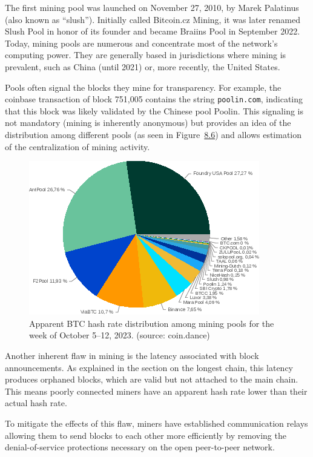 \documentclass[
  a5paper,
  smalldemyvopaper,10pt,twoside,onecolumn,openright,extrafontsizes,hidelinks]{memoir}
\begin{document}
The first mining pool was launched on November 27, 2010, by Marek
Palatinus (also known as ``slush''). Initially called Bitcoin.cz Mining,
it was later renamed Slush Pool in honor of its founder and became
Braiins Pool in September 2022. Today, mining pools are numerous and
concentrate most of the network's computing power. They are generally
based in jurisdictions where mining is prevalent, such as China (until
2021) or, more recently, the United States.

Pools often signal the blocks they mine for transparency. For example,
the coinbase transaction of block 751,005 contains the string
\texttt{poolin.com}, indicating that this block was likely validated by
the Chinese pool Poolin. This signaling is not mandatory (mining is
inherently anonymous) but provides an idea of the distribution among
different pools (as seen in
Figure~\hyperref[fig:hashrate-distribution]{8.6}) and allows estimation
of the centralization of mining activity.

\begin{figure}

{\centering \includegraphics{chapters/img/hashrate-distribution-coin-dance-week-20231012.png}

}

\caption{Apparent BTC hash rate distribution among mining pools for the
week of October 5--12, 2023. (source: coin.dance)}

\end{figure}%

Another inherent flaw in mining is the latency associated with block
announcements. As explained in the section on the longest chain, this
latency produces orphaned blocks, which are valid but not attached to
the main chain. This means poorly connected miners have an apparent hash
rate lower than their actual hash rate.

To mitigate the effects of this flaw, miners have established
communication relays allowing them to send blocks to each other more
efficiently by removing the denial-of-service protections necessary on
the open peer-to-peer network.
\end{document}
